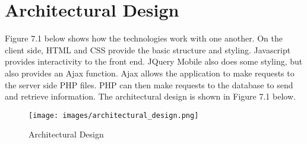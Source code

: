 \chapter{Architectural Design}
Figure 7.1 below shows how the technologies work with one another. On the client side, HTML and CSS provide the basic structure and styling. Javascript provides interactivity to the front end. JQuery Mobile also does some styling, but also provides an Ajax function. Ajax allows the application to make requests to the server side PHP files. PHP can then make requests to the database to send and retrieve information. The architectural design is shown in Figure 7.1 below.

\begin{figure}[h]
	\centering
	\texttt{[image: images/architectural\_design.png]}
	\caption{Architectural Design}
	\label{fig:architectural design}
\end{figure}